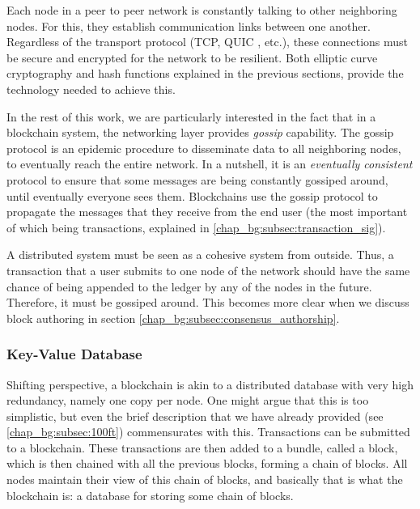 Each node in a peer to peer network is constantly talking to other neighboring nodes. For this, they
establish communication links between one another. Regardless of the transport protocol (TCP, QUIC
\cite{carlucciHTTPUDPExperimental2015}, etc.), these connections must be secure and encrypted for
the network to be resilient. Both elliptic curve cryptography and hash functions explained in the
previous sections, provide the technology needed to achieve this.

In the rest of this work, we are particularly interested in the fact that in a blockchain system,
the networking layer provides \textit{gossip} capability. The gossip protocol is an epidemic
procedure to disseminate data to all neighboring nodes, to eventually reach the entire network. In a
nutshell, it is an \textit{eventually consistent} protocol to ensure that some messages are being
constantly gossiped around, until eventually everyone sees them. Blockchains use the gossip protocol
to propagate the messages that they receive from the end user (the most important of which being
transactions, explained in \ref{chap_bg:subsec:transaction_sig}).

A distributed system must be seen as a cohesive system from outside. Thus, a transaction that a user
submits to one node of the network should have the same chance of being appended to the ledger by
any of the nodes in the future. Therefore, it must be gossiped around. This becomes more clear when
we discuss block authoring in section \ref{chap_bg:subsec:consensus_authorship}.

\subsubsection{Key-Value Database} \label{chap_bg:subsec:kvdb}

Shifting perspective, a blockchain is akin to a distributed database with very high redundancy,
namely one copy per node. One might argue that this is too simplistic, but even the brief
description that we have already provided (see \ref{chap_bg:subsec:100ft}) commensurates with this.
Transactions can be submitted to a blockchain. These transactions are then added to a bundle, called
a block, which is then chained with all the previous blocks, forming a chain of blocks. All nodes
maintain their view of this chain of blocks, and basically that is what the blockchain is: a
database for storing some chain of blocks.

